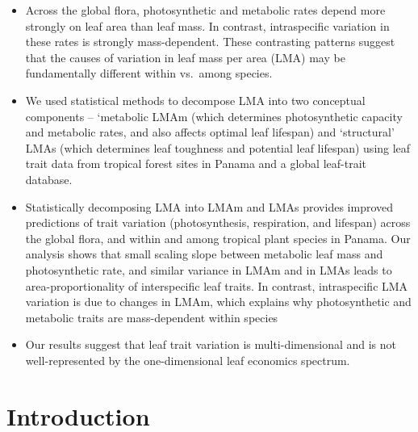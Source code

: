 \documentclass[
  12pt,
]{article}
\begin{document}
\begin{itemize}
\item
  Across the global flora, photosynthetic and metabolic rates depend more strongly on leaf area than leaf mass.
  In contrast, intraspecific variation in these rates is strongly mass-dependent.
  These contrasting patterns suggest that the causes of variation in leaf mass per area (LMA) may be fundamentally different within vs.~among species.
\item
  We used statistical methods to decompose LMA into two conceptual components -- `metabolic LMAm (which determines photosynthetic capacity and metabolic rates, and also affects optimal leaf lifespan) and `structural' LMAs (which determines leaf toughness and potential leaf lifespan) using leaf trait data from tropical forest sites in Panama and a global leaf-trait database.
\item
  Statistically decomposing LMA into LMAm and LMAs provides improved predictions of trait variation (photosynthesis, respiration, and lifespan) across the global flora, and within and among tropical plant species in Panama.
  Our analysis shows that small scaling slope between metabolic leaf mass and photosynthetic rate, and similar variance in LMAm and in LMAs leads to area-proportionality of interspecific leaf traits.
  In contrast, intraspecific LMA variation is due to changes in LMAm, which explains why photosynthetic and metabolic traits are mass-dependent within species
\item
  Our results suggest that leaf trait variation is multi-dimensional and is not well-represented by the one-dimensional leaf economics spectrum.
\end{itemize}

\hypertarget{introduction}{%
\section{Introduction}\label{introduction}}
\end{document}
